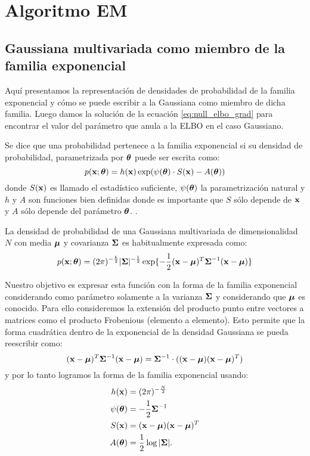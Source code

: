\chapter{Algoritmo EM}
\section{Gaussiana multivariada como miembro de la familia exponencial}\label{appendix:exp_family}

Aquí presentamos la representación de densidades de probabilidad de la familia exponencial y cómo se puede escribir a la Gaussiana como miembro de dicha familia. Luego damos la solución de la ecuación \ref{eq:null_elbo_grad} para encontrar el valor del parámetro que anula a la ELBO en el caso Gaussiano.

Se dice que una probabilidad pertenece a la familia exponencial si su densidad de probabilidad, parametrizada por $\mbox{\boldmath$ \theta $}$ puede ser escrita como:
$$p(\mathbf{x}; \mbox{\boldmath$ \theta $}) = h(\mathbf{x}) \exp(\psi(\mbox{\boldmath$ \theta $}) \cdot S(\mathbf{x}) - A(\mbox{\boldmath$ \theta $}))$$
donde $S(\mathbf{x})$ es llamado el estadístico suficiente, $\psi(\mbox{\boldmath$ \theta $})$ la parametrización natural y $h$ y $A$ son funciones bien definidas donde es importante que $S$ sólo depende de $\mathbf{x}$ y $A$ sólo depende del parámetro $\mbox{\boldmath$ \theta $}$. \citep{Wasserman2004}.

La densidad de probabilidad de una Gaussiana multivariada de dimensionalidad $N$ con media $\mbox{\boldmath$ \mu $}$ y covarianza $\mbox{\boldmath$ \Sigma $}$ es habitualmente expresada como:
$$p(\mathbf{x}; \mbox{\boldmath$ \theta $}) = (2\pi)^{-\frac{k}{2}} |\mbox{\boldmath$ \Sigma $}|^{-\frac{1}{2}} \exp \{ - \frac{1}{2}(\mathbf{x}- \mbox{\boldmath$ \mu $})^T \mbox{\boldmath$ \Sigma $}^{-1}(\mathbf{x}-\mbox{\boldmath$ \mu $}) \}$$

Nuestro objetivo es expresar esta función con la forma de la familia exponencial considerando como parámetro solamente a la varianza $\mbox{\boldmath$ \Sigma $}$ y considerando que $\mbox{\boldmath$ \mu $}$ es conocido. Para ello consideremos la extensión del producto punto entre vectores a matrices como el producto Frobenious (elemento a elemento). Esto permite que la forma cuadrática dentro de la exponencial de la densidad Gaussiana se pueda reescribir como:
$$(\mathbf{x}- \mbox{\boldmath$ \mu $})^T \mbox{\boldmath$ \Sigma $}^{-1}(\mathbf{x}-\mbox{\boldmath$ \mu $}) = \mbox{\boldmath$ \Sigma $}^{-1} \cdot ((\mathbf{x}- \mbox{\boldmath$ \mu $}) (\mathbf{x}-\mbox{\boldmath$ \mu $})^T)$$
y por lo tanto logramos la forma de la familia exponencial usando:
\begin{align*}
    h(\mathbf{x}) &= (2\pi)^{-\frac{N}{2}} \\
    \psi(\mbox{\boldmath$ \theta $}) &=  -\frac{1}{2}\mbox{\boldmath$ \Sigma $}^{-1} \\ 
    S(\mathbf{x}) &= (\mathbf{x}- \mbox{\boldmath$ \mu $}) (\mathbf{x}-\mbox{\boldmath$ \mu $})^T \\
    A(\mbox{\boldmath$ \theta $}) &= \frac{1}{2} \log |\mbox{\boldmath$ \Sigma $}|.
\end{align*} 

